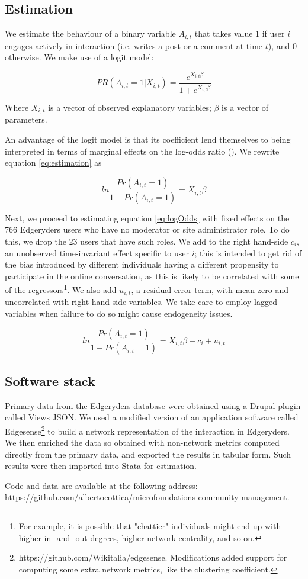 \subsection{Estimation}

We estimate the behaviour of a binary variable $A_{i,t}$ that takes value $1$ if user $i$ engages actively in interaction (i.e. writes a post or a comment at time $t$), and $0$ otherwise. We make use of a logit model:

\begin{equation}
	PR(A_{i,t}= 1|X_{i,t}) = \frac{e^{X_{i,t}\beta}}{1 + e^{X_{i,t}\beta}}
	\label{eq:estimation}
\end{equation}

Where $X_{i,t}$ is a vector of observed explanatory variables; $\beta$ is a vector of parameters.

An advantage of the logit model is that its coefficient lend themselves to being interpreted in terms of marginal effects on the log-odds ratio (\cite{cameron2005microeconometrics}). We rewrite equation \ref{eq:estimation} as

\begin{equation}
	ln \frac{Pr(A_{i,t} = 1)}{1 - Pr(A_{i,t}=1)} = X_{i,t} \beta 
	\label{eq:logOdds}
\end{equation}

Next, we proceed to estimating equation \ref{eq:logOdds} with fixed effects on the 766 Edgeryders users who have no moderator or site administrator role. To do this, we drop the 23 users that have such roles. We add to the right hand-side
$c_i$, an unobserved time-invariant effect specific to user $i$; this is intended to get rid of the bias introduced by different individuals having a different propensity to participate in the online conversation, as this is likely to be correlated with some of the regressors\footnote{For example, it is possible that "chattier" individuals might end up with higher in- and -out degrees, higher network centrality, and so on. }. We also add $u_{i,t}$, a residual error term, with mean zero and uncorrelated with right-hand side variables. We take care to employ lagged variables when failure to do so might cause endogeneity issues. 

\begin{equation}
	ln \frac{Pr(A_{i,t} = 1)}{1 - Pr(A_{i,t}=1)} = X_{i,t} \beta + c_i + u_{i,t}
	\label{eq:logOddsErrors}
\end{equation}

\subsection{Software stack}
Primary data from the Edgeryders database were obtained using a Drupal plugin called Views JSON. We used a modified version of an application software called Edgesense\footnote{https://github.com/Wikitalia/edgesense. Modifications added support for computing some extra network metrics, like the clustering coefficient.} to build a network representation of the interaction in Edgeryders. We then enriched the data so obtained with non-network metrics computed directly from the primary data, and exported the results in tabular form. Such results were then imported into Stata for estimation. 

Code and data are available at the following address: \url{https://github.com/albertocottica/microfoundations-community-management}.
